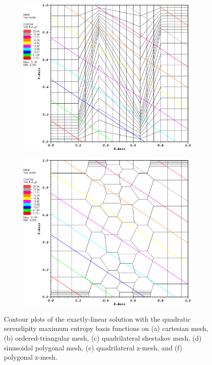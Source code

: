 \begin{figure}
\begin{subfigure}[b]{0.45\textwidth}
		\caption{}
	\end{subfigure}
	\vfill
	\begin{subfigure}[b]{0.45\textwidth}
		\centering
		\label{subfig::z_quad_me_k2_lin_sol}
		\includegraphics[width=\textwidth]{figures/sec_BF/z_quad_MAXENT_k2.eps}
		\caption{}
	\end{subfigure}
	\hfill
	\begin{subfigure}[b]{0.45\textwidth}
		\centering
		\label{subfig::z_poly_me_k2_lin_sol}
		\includegraphics[width=\textwidth]{figures/sec_BF/z_poly_MAXENT_k2.eps}
		\caption{}
	\end{subfigure}
\caption{Contour plots of the exactly-linear solution with the quadratic serendipity maximum entropy basis functions on (a) cartesian mesh, (b) ordered-triangular mesh, (c) quadrilateral shestakov mesh, (d) sinusoidal polygonal mesh, (e) quadrilateral z-mesh, and (f) polygonal z-mesh.}
\label{fig::BF_Results_Linear_me2_sol}
\end{figure}
\fi
